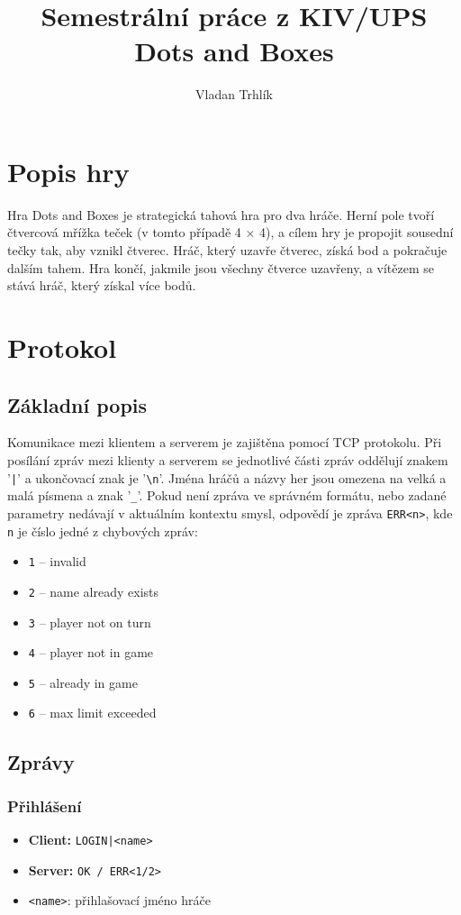 \documentclass[11pt,a4paper]{article}
\author{Vladan Trhlík}
\title{%
	Semestrální práce z KIV/UPS \\
	\large Dots and Boxes  \\
}
\begin{document}
\maketitle

\section{Popis hry}
Hra Dots and Boxes je strategická tahová hra pro dva hráče. Herní pole tvoří čtvercová mřížka teček (v tomto případě 4 × 4), a cílem hry je propojit sousední tečky tak, aby vznikl čtverec. Hráč, který uzavře čtverec, získá bod a pokračuje dalším tahem. Hra končí, jakmile jsou všechny čtverce uzavřeny, a vítězem se stává hráč, který získal více bodů.
\section{Protokol}

\subsection{Základní popis}
Komunikace mezi klientem a serverem je zajištěna pomocí TCP protokolu. Při posílání zpráv mezi klienty a serverem se jednotlivé části zpráv oddělují znakem '\texttt{|}' a ukončovací znak je '\texttt{\textbackslash n}'. Jména hráčů a názvy her jsou omezena na velká a malá písmena a znak '\texttt{\_}'. Pokud není zpráva ve správném formátu, nebo zadané parametry nedávají v aktuálním kontextu smysl, odpovědí je zpráva \texttt{ERR<n>}, kde \texttt{n} je číslo jedné z chybových zpráv:
\begin{itemize}
	\item \texttt{1} -- invalid
	\item \texttt{2} -- name already exists
	\item \texttt{3} -- player not on turn
	\item \texttt{4} -- player not in game
	\item \texttt{5} -- already in game
	\item \texttt{6} -- max limit exceeded
\end{itemize}

\subsection{Zprávy}
\subsubsection*{Přihlášení}
\begin{itemize}
	\item \textbf{Client:} \texttt{LOGIN|<name>}
	\item \textbf{Server:} \texttt{OK / ERR<1/2>}
	\item \texttt{<name>}: přihlašovací jméno hráče
\end{itemize}
\end{document}
